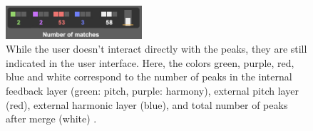  \begin{figure}[h!]
    \centering        
 	\includegraphics[width=0.45\textwidth]{img/peaks_ui_2-5.png}
    \caption{While the user doesn't interact directly with the peaks, they are still indicated in the user interface.    Here, the colors green, purple, red, blue and white correspond to the number of peaks in the internal feedback layer (green: pitch, purple: harmony), external pitch layer (red), external harmonic layer (blue), and total number of peaks after merge (white) .}
    \label{fig:peaks}
\end{figure}



